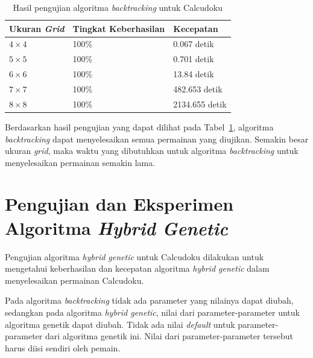 \begin{table}
\centering
\captionsetup{justification=centering}
\caption[Hasil pengujian algoritma \textit{backtracking} untuk Calcudoku]{Hasil pengujian algoritma \textit{backtracking} untuk Calcudoku}
\begin{tabular}{| l | l | l |}
\hline
Ukuran \textit{Grid} & Tingkat Keberhasilan & Kecepatan \\
\hline \hline
\begin{math}4 \times 4\end{math} & 100\% & 0.067 detik \\
\hline
\begin{math}5 \times 5\end{math} & 100\% & 0.701 detik \\
\hline
\begin{math}6 \times 6\end{math} & 100\% & 13.84 detik \\
\hline
\begin{math}7 \times 7\end{math} & 100\% & 482.653 detik \\
\hline
\begin{math}8 \times 8\end{math} & 100\% & 2134.655 detik \\
\hline
\end{tabular}
\label{tab:pengujianbt}
\end{table}

Berdasarkan hasil pengujian yang dapat dilihat pada Tabel~\ref{tab:pengujianbt}, algoritma \textit{backtracking} dapat menyelesaikan semua permainan yang diujikan. Semakin besar ukuran \textit{grid}, maka waktu yang dibutuhkan untuk algoritma \textit{backtracking} untuk menyelesaikan permainan semakin lama.

\section{Pengujian dan Eksperimen Algoritma \textit{Hybrid Genetic}}
\label{sec:pengujianhybridgenetic}

Pengujian algoritma \textit{hybrid genetic} untuk Calcudoku dilakukan untuk mengetahui keberhasilan dan kecepatan algoritma \textit{hybrid genetic} dalam menyelesaikan permainan Calcudoku.

Pada algoritma \textit{backtracking} tidak ada parameter yang nilainya dapat diubah, sedangkan pada algoritma \textit{hybrid genetic}, nilai dari parameter-parameter untuk algoritma genetik dapat diubah. Tidak ada nilai \textit{default} untuk parameter-parameter dari algoritma genetik ini. Nilai dari parameter-parameter tersebut harus diisi sendiri oleh pemain.


